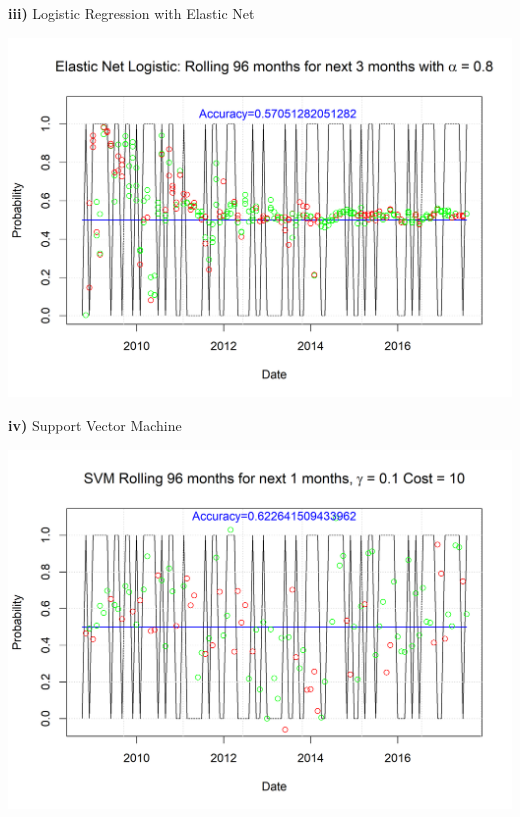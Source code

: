 \documentclass[12pt]{amsart}
\begin{document}
\textbf{iii)} Logistic Regression with Elastic Net\\

\begin{center}
	\includegraphics[scale=0.9]{IYW_logistic_elastic_rolling}
\end{center}

\textbf{iv)} Support Vector Machine\\

\begin{center}
	\includegraphics[scale=0.9]{IYW_SVM_rolling_penalize}
\end{center}
\end{document}
